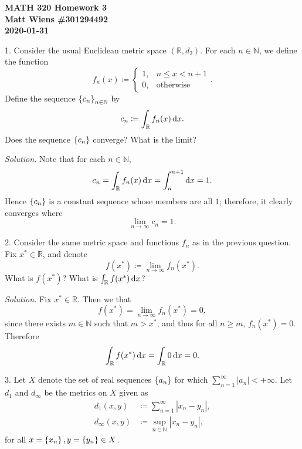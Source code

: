 \documentclass{article}
\newcommand{\N}{\mathbb{N}}
\newcommand{\R}{\mathbb{R}}
\begin{document}
\textbf{MATH 320 Homework 3} \\
\textbf{Matt Wiens \#301294492} \\
\textbf{2020-01-31}

1. Consider the usual Euclidean metric space $(\R, d_2)$. For each $n
   \in \N$, we define the function
%
\begin{equation*}
    f_n(x) \coloneqq
        \begin{cases}
            1 ,& n \leq x < n + 1 \\
            0 ,& \text{otherwise}
        \end{cases}
    .
\end{equation*}
%
Define the sequence $\cbr{c_n}_{n \in \N}$ by
%
\begin{equation*}
    c_n \coloneqq \int_{\R} f_n(x) \dif x
    .
\end{equation*}
%
Does the sequence $\cbr{c_n}$ converge? What is the limit?

\textit{Solution.}
Note that for each $n \in \N$,
%
\begin{equation*}
    c_n = \int_{\R} f_n(x) \dif x = \int_{n}^{n + 1} \dif x = 1
    .
\end{equation*}
%
Hence $\cbr{c_n}$ is a constant sequence whose members are all $1$;
therefore, it clearly converges where
%
\begin{equation*}
    \lim_{n \to \infty} c_n = 1
    .
\end{equation*}

\newpage

2. Consider the same metric space and functions $f_n$ as in the previous
   question. Fix $x^* \in \R$, and denote
%
\begin{equation*}
    f(x^*) \coloneqq \lim_{n \to \infty} f_n(x^*)
    .
\end{equation*}
%
What is $f(x^*)$? What is $\int_{\R} f(x^*) \dif x$?

\textit{Solution.} Fix $x^* \in \R$. Then we that
%
\begin{equation*}
    f(x^*) = \lim_{n \to \infty} f_n(x^*) = 0
    ,
\end{equation*}
%
since there exists $m \in \N$ such that $m > x^*$, and thus for all $n
\geq m$, $f_n(x^*) = 0$. Therefore
%
\begin{equation*}
    \int_{\R} f(x^*) \dif x
    = \int_{\R} 0 \dif x
    = 0
    .
\end{equation*}

\newpage

3. Let $X$ denote the set of real sequences $\cbr{a_n}$ for which
   $\sum_{n = 1}^\infty |a_n| < +\infty$. Let $d_1$ and $d_{\infty}$ be
   the metrics on $X$ given as
%
\begin{align*}
    d_1(x,y) &\coloneqq \sum_{n = 1}^\infty |x_n-y_n|, \\
    d_{\infty}(x,y) &\coloneqq \sup_{n \in \N} |x_n - y_n|,
\end{align*}
%
for all $x = \cbr{x_n}, y = \cbr{y_n} \in X$.
\end{document}
